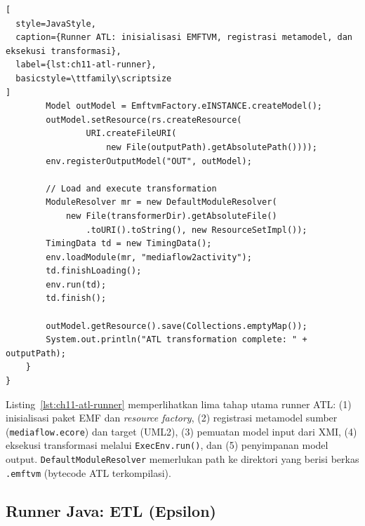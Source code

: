 \begin{lstlisting}[
  style=JavaStyle,
  caption={Runner ATL: inisialisasi EMFTVM, registrasi metamodel, dan eksekusi transformasi},
  label={lst:ch11-atl-runner},
  basicstyle=\ttfamily\scriptsize
]
        Model outModel = EmftvmFactory.eINSTANCE.createModel();
        outModel.setResource(rs.createResource(
                URI.createFileURI(
                    new File(outputPath).getAbsolutePath())));
        env.registerOutputModel("OUT", outModel);

        // Load and execute transformation
        ModuleResolver mr = new DefaultModuleResolver(
            new File(transformerDir).getAbsoluteFile()
                .toURI().toString(), new ResourceSetImpl());
        TimingData td = new TimingData();
        env.loadModule(mr, "mediaflow2activity");
        td.finishLoading();
        env.run(td);
        td.finish();

        outModel.getResource().save(Collections.emptyMap());
        System.out.println("ATL transformation complete: " + outputPath);
    }
}
\end{lstlisting}

\noindent Listing~\ref{lst:ch11-atl-runner} memperlihatkan lima tahap utama runner ATL: (1) inisialisasi paket EMF dan \textit{resource factory}, (2) registrasi metamodel sumber (\texttt{mediaflow.ecore}) dan target (UML2), (3) pemuatan model input dari XMI, (4) eksekusi transformasi melalui \texttt{ExecEnv.run()}, dan (5) penyimpanan model output. \texttt{DefaultModuleResolver} memerlukan path ke direktori yang berisi berkas \texttt{.emftvm} (bytecode ATL terkompilasi).

\subsection{Runner Java: ETL (Epsilon)}

